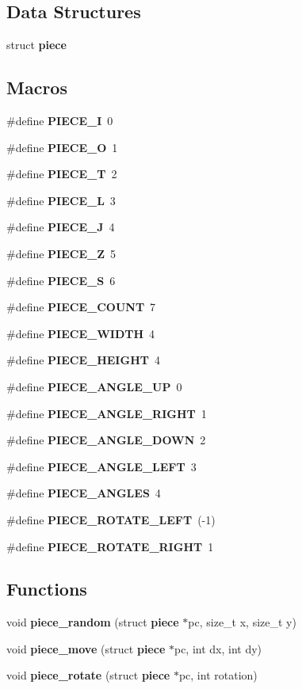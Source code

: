 \subsection*{Data Structures}
\begin{DoxyCompactItemize}
\item 
struct \textbf{ piece}
\end{DoxyCompactItemize}
\subsection*{Macros}
\begin{DoxyCompactItemize}
\item 
\#define \textbf{ P\+I\+E\+C\+E\+\_\+I}~0
\item 
\#define \textbf{ P\+I\+E\+C\+E\+\_\+O}~1
\item 
\#define \textbf{ P\+I\+E\+C\+E\+\_\+T}~2
\item 
\#define \textbf{ P\+I\+E\+C\+E\+\_\+L}~3
\item 
\#define \textbf{ P\+I\+E\+C\+E\+\_\+J}~4
\item 
\#define \textbf{ P\+I\+E\+C\+E\+\_\+Z}~5
\item 
\#define \textbf{ P\+I\+E\+C\+E\+\_\+S}~6
\item 
\#define \textbf{ P\+I\+E\+C\+E\+\_\+\+C\+O\+U\+NT}~7
\item 
\#define \textbf{ P\+I\+E\+C\+E\+\_\+\+W\+I\+D\+TH}~4
\item 
\#define \textbf{ P\+I\+E\+C\+E\+\_\+\+H\+E\+I\+G\+HT}~4
\item 
\#define \textbf{ P\+I\+E\+C\+E\+\_\+\+A\+N\+G\+L\+E\+\_\+\+UP}~0
\item 
\#define \textbf{ P\+I\+E\+C\+E\+\_\+\+A\+N\+G\+L\+E\+\_\+\+R\+I\+G\+HT}~1
\item 
\#define \textbf{ P\+I\+E\+C\+E\+\_\+\+A\+N\+G\+L\+E\+\_\+\+D\+O\+WN}~2
\item 
\#define \textbf{ P\+I\+E\+C\+E\+\_\+\+A\+N\+G\+L\+E\+\_\+\+L\+E\+FT}~3
\item 
\#define \textbf{ P\+I\+E\+C\+E\+\_\+\+A\+N\+G\+L\+ES}~4
\item 
\#define \textbf{ P\+I\+E\+C\+E\+\_\+\+R\+O\+T\+A\+T\+E\+\_\+\+L\+E\+FT}~(-\/1)
\item 
\#define \textbf{ P\+I\+E\+C\+E\+\_\+\+R\+O\+T\+A\+T\+E\+\_\+\+R\+I\+G\+HT}~1
\end{DoxyCompactItemize}
\subsection*{Functions}
\begin{DoxyCompactItemize}
\item 
void \textbf{ piece\+\_\+random} (struct \textbf{ piece} $\ast$pc, size\+\_\+t x, size\+\_\+t y)
\item 
void \textbf{ piece\+\_\+move} (struct \textbf{ piece} $\ast$pc, int dx, int dy)
\item 
void \textbf{ piece\+\_\+rotate} (struct \textbf{ piece} $\ast$pc, int rotation)
\end{DoxyCompactItemize}
